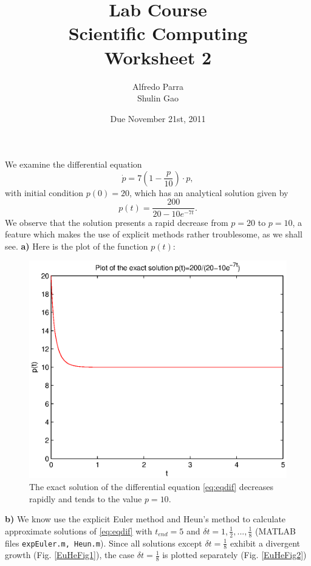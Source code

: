 \documentclass[a4paper,10pt]{article}
\begin{document}
\title{Lab Course\\Scientific Computing\\ Worksheet 2}
\author{Alfredo Parra\\ Shulin Gao}
\date{Due November 21st, 2011}
\maketitle
\oddsidemargin 0.0in

We examine the differential equation
\begin{equation}
\dot{p}=7\left(1-\frac{p}{10}\right)\cdot p,
\label{eq:eqdif}
\end{equation}
with initial condition $p(0)=20$, which has an analytical solution given by
\begin{equation}
p(t)=\frac{200}{20-10e^{-7t}}.
\label{eq:solEx}
\end{equation}
We observe that the solution presents a rapid decrease from $p=20$ to $p=10$, a feature which makes the use of explicit methods rather troublesome, as we shall see.
\textbf{a)} Here is the plot of the function $p(t)$:

\begin{figure}[H]%
\centering
\includegraphics[width=.7\columnwidth]{ExactGraph.eps}%
\caption{The exact solution of the differential equation \eqref{eq:eqdif} decreases rapidly and tends to the value $p=10$.}%
\label{ExactFig}%
\end{figure}
\textbf{b)} We know use the explicit Euler method and Heun's method to calculate approximate solutions of \eqref{eq:eqdif} with $t_{end}=5$ and $\delta t=1,\frac{1}{2},...,\frac{1}{8}$ (MATLAB files \texttt{expEuler.m, Heun.m}). Since all solutions except $\delta t = \frac{1}{8}$ exhibit a divergent growth (Fig. \ref{EuHeFig1}), the case $\delta t = \frac{1}{8}$ is plotted separately (Fig. \ref{EuHeFig2})
\end{document}
